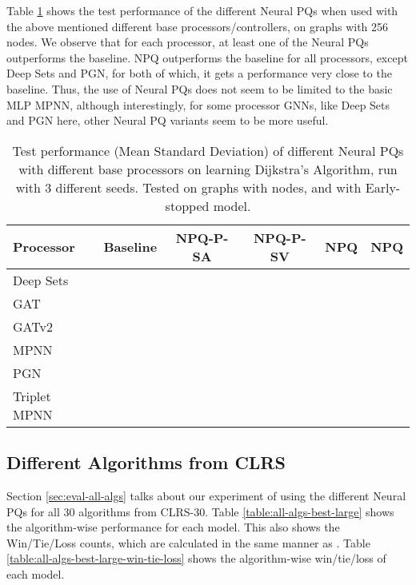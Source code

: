 \documentclass{article}
\theoremstyle{plain}
\theoremstyle{definition}
\theoremstyle{remark}
\begin{document}
Table \ref{table:all-procs-best-large} shows the test performance of the different Neural PQs when used with the above mentioned different base processors/controllers,
on graphs with 256 nodes.
We observe that for each processor, at least one of the Neural PQs outperforms the baseline.
NPQ outperforms the baseline for all processors, except Deep Sets and PGN, for both of which, it gets
a performance very close to the baseline. Thus, the use of Neural PQs does not seem to be limited to the basic MLP MPNN, although
interestingly, for some processor GNNs, like Deep Sets and PGN here, other Neural PQ variants seem to be more useful.

\setlength{\tabcolsep}{4pt}
\begin{table}[tbhp]
\begin{adjustwidth}{-2cm}{-2cm}
\centering
\captionsetup{margin=2cm}
\caption[Evaluation results with different bases on Dijkstra's algorithm on graphs with 256 nodes]{Test performance (Mean  Standard Deviation) of different
         Neural PQs with different base processors on learning Dijkstra's Algorithm,
         run with 3 different seeds. Tested on graphs with  nodes, and with Early-stopped model.}
\small
\begin{tabular}{lccccc}
    \hline
    \bfseries Processor & \bfseries Baseline & \bfseries NPQ-P-SA & \bfseries NPQ-P-SV & \bfseries NPQ & \bfseries NPQ \\
    \hline
    Deep Sets &  &  &  &  &  \\
    GAT &  &  &  &  &  \\
    GATv2 &  &  &  &  &  \\
    MPNN &  &  &  &  &  \\
    PGN &  &  &  &  &  \\
    Triplet MPNN &  &  &  &  &  \\
    \hline
\end{tabular}
\label{table:all-procs-best-large}
\end{adjustwidth}
\end{table}
\setlength{\tabcolsep}{6pt}

\subsection{Different Algorithms from CLRS}
Section \ref{sec:eval-all-algs} talks about our experiment of using the different Neural PQs for all 30 algorithms from CLRS-30.
Table \ref{table:all-algs-best-large} shows the algorithm-wise performance for each model. This also shows the Win/Tie/Loss
counts, which are calculated in the same manner as \citet{Velickovic-CLRS}. Table \ref{table:all-algs-best-large-win-tie-loss}
shows the algorithm-wise win/tie/loss of each model.
\end{document}
